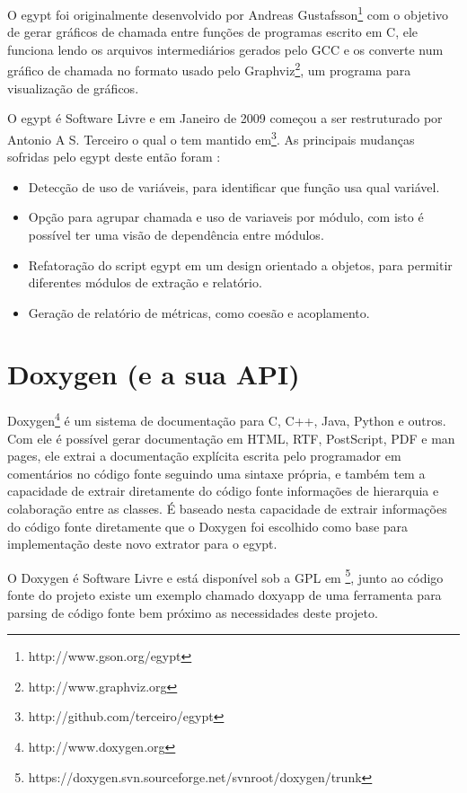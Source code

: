 O egypt foi originalmente desenvolvido por Andreas
Gustafsson\footnote{http://www.gson.org/egypt} com o objetivo de gerar gráficos
de chamada entre funções de programas escrito em C, ele funciona lendo os
arquivos intermediários gerados pelo GCC e os
converte num gráfico de chamada no formato usado pelo
Graphviz\footnote{http://www.graphviz.org}, um programa para visualização de
gráficos.

O egypt é Software Livre e em Janeiro de 2009 começou a ser restruturado por
Antonio A S. Terceiro o qual o tem mantido
em\footnote{http://github.com/terceiro/egypt}. As principais mudanças sofridas
pelo egypt deste então foram \cite{StructuralComplexityEvolution}:

\begin{itemize}
\item Detecção de uso de variáveis, para identificar que função usa qual
variável.
\item Opção para agrupar chamada e uso de variaveis por módulo, com isto é
possível ter uma visão de dependência entre módulos.
\item Refatoração do script egypt em um design orientado a objetos, para
permitir diferentes módulos de extração e relatório.
\item Geração de relatório de métricas, como coesão e acoplamento.
\end{itemize}

\section{Doxygen (e a sua API)}

Doxygen\footnote{http://www.doxygen.org} é um sistema de documentação para C,
C++, Java, Python e outros. Com ele é possível gerar documentação em HTML, RTF,
PostScript, PDF e man pages, ele extrai a documentação explícita escrita pelo
programador em comentários no código fonte seguindo uma sintaxe própria, e
também tem a capacidade de extrair diretamente do código fonte informações de
hierarquia e colaboração entre as classes. É baseado nesta capacidade de
extrair informações do código fonte diretamente que o Doxygen foi escolhido
como base para implementação deste novo extrator para o egypt.

O Doxygen é Software Livre e está disponível sob a GPL  em
\footnote{https://doxygen.svn.sourceforge.net/svnroot/doxygen/trunk}, junto ao
código fonte do projeto existe um exemplo chamado doxyapp de uma ferramenta
para parsing de código fonte bem próximo as necessidades deste projeto.

